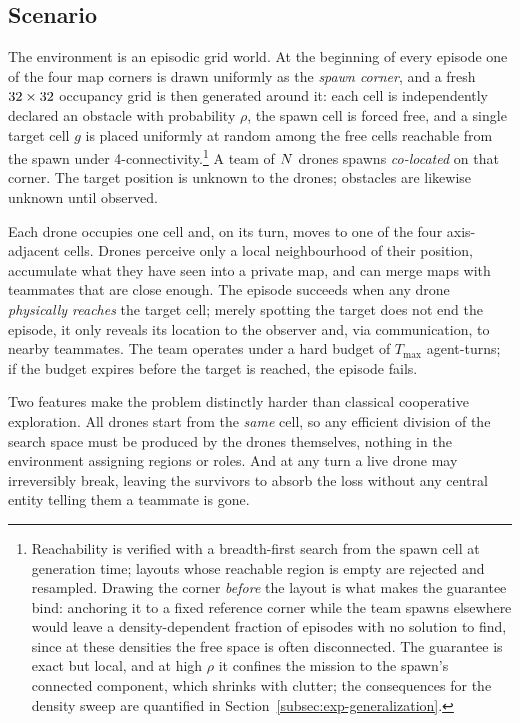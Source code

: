 \subsection{Scenario}
\label{subsec:prob-scenario}

The environment is an episodic grid world. At the beginning of every episode one
of the four map corners is drawn uniformly as the \emph{spawn corner}, and a
fresh $32\times32$ occupancy grid is then generated around it: each
cell is independently declared an obstacle with probability $\rho$, the spawn
cell is forced free, and a single target cell $g$ is placed uniformly at random
among the free cells reachable from the spawn under
4-connectivity.\footnote{Reachability is verified with a breadth-first search
from the spawn cell at generation time; layouts whose reachable region is empty
are rejected and resampled. Drawing the corner \emph{before} the layout is what
makes the guarantee bind: anchoring it to a fixed reference corner while the
team spawns elsewhere would leave a density-dependent fraction of episodes with
no solution to find, since at these densities the free space is often
disconnected. The guarantee is exact but local, and at high $\rho$ it confines
the mission to the spawn's connected component, which shrinks with clutter; the
consequences for the density sweep are quantified in
Section~\ref{subsec:exp-generalization}.} A team of
$N$ drones spawns \emph{co-located} on that corner.
The target position is unknown to the drones;
obstacles are likewise unknown until observed.

Each drone occupies one cell and, on its turn, moves to one of the four
axis-adjacent cells. Drones perceive only a local neighbourhood of their
position, accumulate what they have seen into a private map, and can merge maps
with teammates that are close enough. The episode succeeds when any drone
\emph{physically reaches} the target cell; merely spotting the target does not
end the episode, it only reveals its location to the observer and, via
communication, to nearby teammates. The team operates under a hard budget of
$T_{\max}$ agent-turns; if the budget expires before the target is reached, the
episode fails.

Two features make the problem distinctly harder than classical cooperative
exploration. All drones start from the \emph{same} cell, so any efficient
division of the search space must be produced by the drones themselves, nothing
in the environment assigning regions or roles. And at any turn a live drone may
irreversibly break, leaving the survivors to absorb the loss without any central
entity telling them a teammate is gone.

